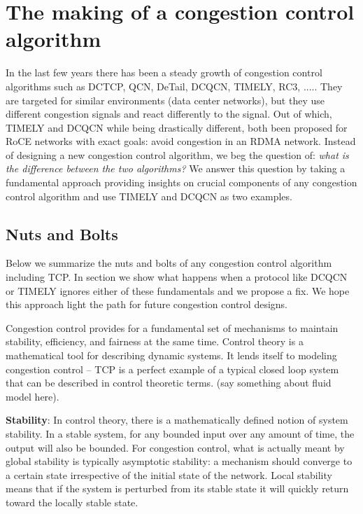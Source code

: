 \section{The making of a congestion control algorithm}

In the last few years there has been a steady growth of congestion control algorithms such as DCTCP, QCN, DeTail, DCQCN, TIMELY, RC3, ..... They are targeted for similar environments (data center networks), but they use different congestion signals and react differently to the signal. Out of which, TIMELY and DCQCN while being drastically different, both been proposed for RoCE networks with exact goals: avoid congestion in an RDMA network. Instead of designing a new congestion control algorithm, we beg the question of: \textit{what is the difference between the two algorithms?} We answer this question by taking a fundamental approach providing insights on crucial components of any congestion control algorithm and use TIMELY and DCQCN as two examples.

\subsection{Nuts and Bolts}
Below we summarize the nuts and bolts of any congestion control algorithm including TCP. In section  we show what happens when a protocol like DCQCN or TIMELY ignores either of these fundamentals and we propose a fix. We hope this approach light the path for future congestion control designs.

Congestion control provides for a fundamental set of mechanisms to maintain
stability, efficiency, and fairness at the same time. Control theory is a mathematical tool for describing dynamic
systems. It lends itself to modeling congestion control -- TCP is a perfect
example of a typical closed loop system that can be described in control
theoretic terms. (say something about fluid model here). 


{\textbf{Stability}}: In control theory, there is a mathematically defined notion of system stability.  In a stable
system, for any bounded input over any amount of time, the output will also be
bounded.  For congestion control, what is actually meant by global  stability is
typically asymptotic stability: a mechanism should converge to a certain state
irrespective of the initial state of the network. Local stability means that if
the system is perturbed from its stable state it will quickly return toward the
locally stable state.

